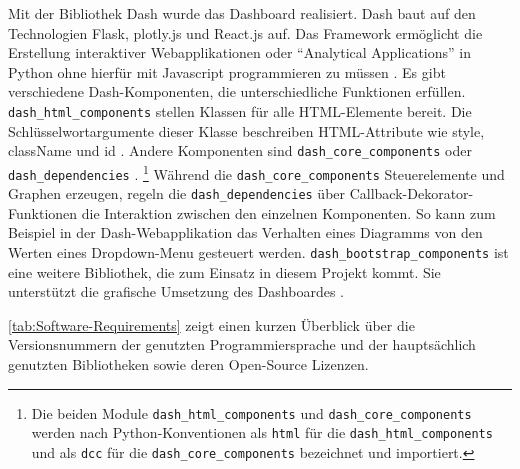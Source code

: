     Mit der Bibliothek Dash wurde das Dashboard realisiert. Dash baut auf den Technologien Flask, plotly.js und React.js auf. Das Framework ermöglicht die Erstellung interaktiver Webapplikationen 
    oder \enquote{Analytical Applications} in Python ohne hierfür mit Javascript programmieren zu müssen \cite[vgl.][]{plotly_dash_2021}.
    Es gibt verschiedene Dash-Komponenten, die unterschiedliche Funktionen erfüllen. \texttt{dash\_html\_components} stellen Klassen für alle HTML-Elemente bereit.
    Die Schlüsselwortargumente dieser Klasse beschreiben HTML-Attribute wie style, className und id \cite[vgl.][]{plotly_dash_2021-2}. 
    Andere Komponenten sind \texttt{dash\_core\_components} oder \texttt{dash\_dependencies} \cite[vgl.][]{plotly_dash_2021-1}.
    \footnote{Die beiden Module \texttt{dash\_html\_components} und \texttt{dash\_core\_components} werden nach Python-Konventionen als \texttt{html} für die \texttt{dash\_html\_components} und als \texttt{dcc} für die \texttt{dash\_core\_components} bezeichnet und importiert.}
    Während die \texttt{dash\_core\_components}
    Steuerelemente und Graphen erzeugen, regeln die \texttt{dash\_dependencies} über Callback-Dekorator-Funktionen die Interaktion zwischen den einzelnen Komponenten.
    So kann zum Beispiel in der Dash-Webapplikation das Verhalten eines Diagramms von den Werten eines Dropdown-Menu gesteuert werden. 
    \texttt{dash\_bootstrap\_components} ist eine weitere Bibliothek, die zum Einsatz in diesem Projekt kommt. Sie unterstützt die grafische Umsetzung
    des Dashboardes \cite[vgl.][]{faculty_dash_2021}.

    \autoref{tab:Software-Requirements} zeigt einen kurzen Überblick über die Versionsnummern der genutzten Programmiersprache und der hauptsächlich 
    genutzten Bibliotheken sowie deren Open-Source Lizenzen.
    
